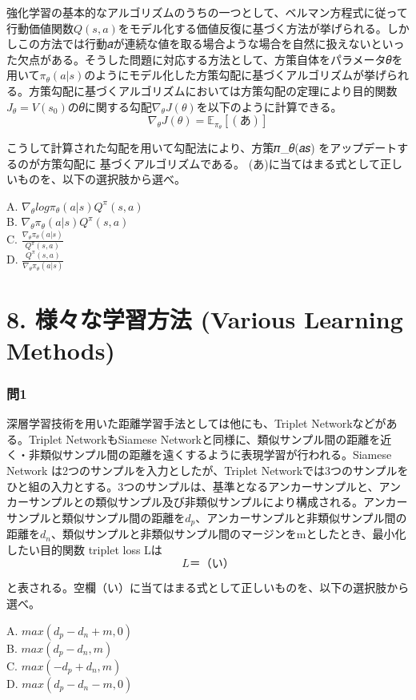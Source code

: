 \documentclass[
  letterpaper,
  DIV=11,
  numbers=noendperiod]{scrreprt}
\begin{document}
強化学習の基本的なアルゴリズムのうちの一つとして、ベルマン方程式に従って行動価値関数\(𝑄(𝑠, 𝑎)\)をモデル化する価値反復に基づく方法が挙げられる。しかしこの方法では行動𝑎が連続な値を取る場合ような場合を自然に扱えないといった欠点がある。そうした問題に対応する方法として、方策自体をパラメータ𝜃を用いて\(𝜋_𝜃(𝑎|𝑠)\)のようにモデル化した方策勾配に基づくアルゴリズムが挙げられる。方策勾配に基づくアルゴリズムにおいては方策勾配の定理により目的関数\(𝐽_𝜃 = 𝑉(𝑠_0)\)の𝜃に関する勾配\(∇_𝜃𝐽(𝜃)\)を以下のように計算できる。
\[
∇_𝜃𝐽(𝜃) = 𝔼_{𝜋_𝜃}[(あ)]
\]

こうして計算された勾配を用いて勾配法により、方策𝜋\_𝜃(𝑎\textbar 𝑠)
をアップデートするのが方策勾配に 基づくアルゴリズムである。
(あ)に当てはまる式として正しいものを、以下の選択肢から選べ。

A. \(∇_𝜃log𝜋_𝜃(𝑎|𝑠)𝑄^𝜋(𝑠,𝑎)\)\\
B. \(∇_𝜃𝜋_𝜃(𝑎|𝑠)𝑄^𝜋(𝑠,𝑎)\)\\
C. \(\frac{∇_𝜃𝜋_𝜃(𝑎|𝑠)}{𝑄^𝜋(𝑠,𝑎)}\)\\
D. \(\frac{𝑄^𝜋(𝑠,𝑎)}{∇_𝜃𝜋_𝜃(𝑎|𝑠)}\)

\chapter{8. 様々な学習方法 (Various Learning
Methods)}\label{ux69d8ux3005ux306aux5b66ux7fd2ux65b9ux6cd5-various-learning-methods}

\subsection{問1}\label{ux554f1-9}

深層学習技術を用いた距離学習手法としては他にも、Triplet
Networkなどがある。Triplet NetworkもSiamese
Networkと同様に、類似サンプル間の距離を近く・非類似サンプル間の距離を遠くするように表現学習が行われる。Siamese
Network は2つのサンプルを入力としたが、Triplet
Networkでは3つのサンプルをひと組の入力とする。3つのサンプルは、基準となるアンカーサンプルと、アンカーサンプルとの類似サンプル及び非類似サンプルにより構成される。アンカーサンプルと類似サンプル間の距離を\({d_p}\)、アンカーサンプルと非類似サンプル間の距離を\({d_n}\)、類似サンプルと非類似サンプル間のマージンをmとしたとき、最小化したい目的関数
triplet loss Lは \[
L ＝（い）
\]

と表される。空欄（い）に当てはまる式として正しいものを、以下の選択肢から選べ。

A. \({max(d_p - d_n + m, 0)}\)\\
B. \({max(d_p - d_n, m)}\)\\
C. \({max(-d_p + d_n, m)}\)\\
D. \({max(d_p - d_n - m, 0)}\)
\end{document}
